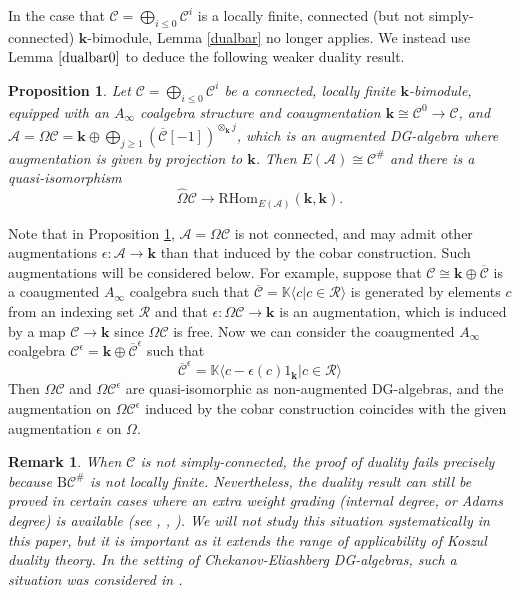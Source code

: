 \documentclass{gtpart}
\newtheorem{prop}[thm]{Proposition}
\newtheorem{rem}[thm]{Remark}
\renewcommand{\k}{\mathbf{k}}
\newcommand{\A}{\mathscr{A}}
\renewcommand{\Bar}{\mathrm{B}}
\renewcommand{\C}{\mathscr{C}}
\begin{document}
In the case that $\C = \bigoplus_{i \leq 0} \C^i$ is a locally finite, connected (but not
simply-connected) $\k$-bimodule,
Lemma \ref{dualbar} no longer applies. We instead use Lemma $\ref{dualbar0}$ to 
deduce the following weaker duality result. 
\begin{prop}\label{almostdualbar} 
	Let $\C = \bigoplus_{i \leq 0} \C^i$ be a connected, locally finite $\k$-bimodule,
    equipped with an $A_\infty$ coalgebra structure and coaugmentation $\k \cong \C^0 \to \C$, and $\A = \Omega \C = \k \oplus
    \bigoplus_{j \geq1} (\overline{\C}[-1])^{\otimes_{\k} j}$, which is an augmented
    DG-algebra where augmentation is given by projection to $\k$.
    Then $E(\A) \cong \C^\#$ and there is a quasi-isomorphism 
\[\widehat{\Omega}{\C} \to  \mathrm{RHom}_{E(\A)}(\k,\k). \]
\end{prop}

Note that in Proposition \ref{almostdualbar}, $\A = \Omega \C$ is not connected, and may admit other
augmentations $\epsilon \colon \A \to \k$ than that induced by the cobar construction.
Such augmentations will be considered below. For example, suppose that $\C \cong \k \oplus
\overline{\C}$ is a coaugmented $A_\infty$ coalgebra such that
$\overline{\C} =  \mathbb{K} \langle c
|  c \in \mathcal{R} \rangle$ is generated by elements $c$ from an indexing set $\mathcal{R}$ and that $\epsilon\colon \Omega \C \to \k$ is an
augmentation, which is induced by a map $\C \to \k$ since $\Omega \C$ is free. Now we can consider
the coaugmented $A_\infty$ coalgebra $\C^\epsilon = \k \oplus \overline{\C}^\epsilon$
such that 
\[ \overline{\C}^{\epsilon} = \mathbb{K} \langle c - \epsilon (c)1_\k | c \in \mathcal{R} \rangle \] 
Then $\Omega \C$ and $\Omega \C^{\epsilon}$ are quasi-isomorphic as non-augmented DG-algebras, and the augmentation
on $\Omega \C^{\epsilon}$ induced by the cobar construction coincides with the given
augmentation $\epsilon$ on $\Omega$. 

\begin{rem} \label{locfinrem} When $\C$ is not simply-connected, the proof of duality fails precisely because
    $\Bar\C^\#$ is not locally finite. Nevertheless, the duality result can still be proved in certain cases where an extra
    \emph{weight} grading (internal degree, or Adams degree) is available (see \cite{LPWZ}, \cite[Appendix A.2]{Posit},
    \cite{herscovich}). We will not study this situation systematically in this paper, but it is  important as it extends the range of applicability of Koszul duality theory.
    In the setting of Chekanov-Eliashberg DG-algebras, such a situation was considered in \cite{EtLe}. 
\end{rem}
\end{document}
